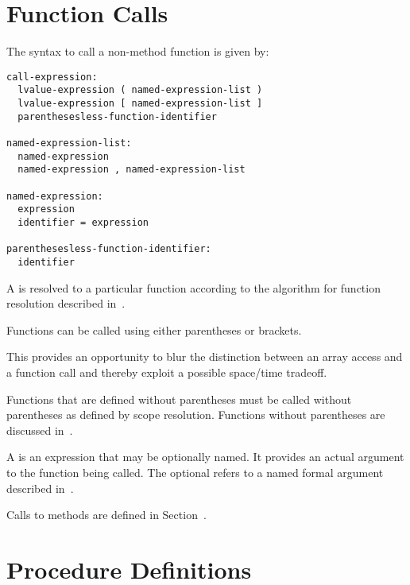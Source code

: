 \section{Function Calls}
\label{Function_Calls}

The syntax to call a non-method function is given by:
\begin{syntax}
\begin{verbatim}
call-expression:
  lvalue-expression ( named-expression-list )
  lvalue-expression [ named-expression-list ]
  parenthesesless-function-identifier

named-expression-list:
  named-expression
  named-expression , named-expression-list

named-expression:
  expression
  identifier = expression

parenthesesless-function-identifier:
  identifier
\end{verbatim}
\end{syntax}


A  is resolved to a particular function
according to the algorithm for function resolution described
in~.

Functions can be called using either parentheses or brackets.

\begin{rationale}
This provides an opportunity to blur the distinction between
an array access and a function call and thereby exploit a
possible space/time tradeoff.
\end{rationale}

Functions that are defined without parentheses must be called without
parentheses as defined by scope resolution.  Functions without
parentheses are discussed in~.

A  is an expression that may be optionally
named.  It provides
an actual argument to the function being called.
The optional  refers to a named formal
argument described in~.

Calls to methods are defined in Section~.


\section{Procedure Definitions}
\label{Function_Definitions}

